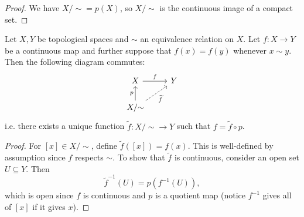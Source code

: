 \begin{proof}
  We have $X / {\sim} = p(X)$, so $X / {\sim}$ is
  the continuous image of a compact set.
\end{proof}

\begin{theorem}
  Let $X, Y$ be topological spaces and $\sim$ an
  equivalence relation on $X$. Let $f : X \to Y$ be
  a continuous map and
  further suppose
  that $f(x) = f(y)$ whenever $x \sim y$. Then
  the following diagram commutes:
  \[
    \begin{tikzcd}
      X \ar[r, "f"] & Y \\
      X / {\sim} \ar[ur, "\widetilde{f}"', dashed] \ar[u, "p"] &
    \end{tikzcd}
  \]
  i.e. there exists a unique function
  $\widetilde{f} : X / {\sim} \to Y$
  such that $f = \widetilde{f} \circ p$.
\end{theorem}

\begin{proof}
  For $[x] \in X / {\sim}$, define
  $\widetilde{f}([x]) = f(x)$. This is well-defined
  by assumption since $f$ respects $\sim$. To
  show that $\widetilde{f}$ is continuous, consider
  an open set $U \subseteq Y$. Then
  \[
    \widetilde{f}^{-1}(U) = p(f^{-1}(U)),
  \]
  which is open since $f$ is continuous and
  $p$ is a quotient map (notice $f^{-1}$
  gives all of $[x]$ if it gives $x$).
\end{proof}

